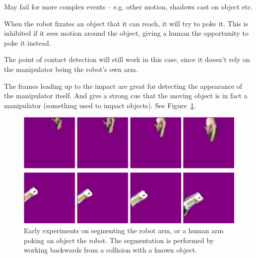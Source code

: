 May fail for more complex events -- e.g. other motion, shadows cast on
object etc.

When the robot fixates an object that it can reach, it will try to poke it.
This is inhibited if it sees motion around the object, giving a human the
opportunity to poke it instead.

The point of contact detection will still work in this case, since it 
doesn't rely on the manipulator being the robot's own arm.

The frames leading up to the impact are great for detecting the
appearance of the manipulator itself.  And give a strong cue that the
moving object is in fact a manipulator (something used to impact
objects).  See Figure~\ref{fig:manipulator}.

\fi

\begin{figure}[tbh]
  \centerline{\includegraphics[width=12cm]{fig-poke-manipulator}}
  \caption{Early experiments on segmenting the robot arm, or a 
human arm poking an object the robot.  The segmentation is
performed by working
backwards from a collision with a known object.}
  \label{fig:manipulator}
\end{figure}

